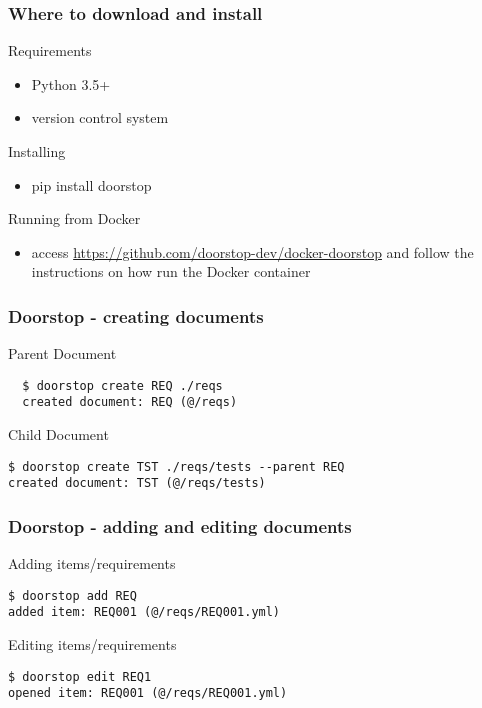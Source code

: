 \documentclass[aspectratio=169]{beamer}
\begin{document}
\begin{frame}
  \frametitle{Where to download and install}  
  \begin{block}{Requirements}
  \begin{itemize}
    \item Python 3.5+
    \item version control system  
  \end{itemize}
  \end{block}
  \begin{block}{Installing}
  \begin{itemize}
    \item pip install doorstop  
  \end{itemize}
  \end{block}
  \begin{block}{Running from Docker}
  \begin{itemize}
    \item access \url{https://github.com/doorstop-dev/docker-doorstop} and follow the instructions on how run the Docker container
  \end{itemize}
  \end{block}
\end{frame}

\begin{frame}[fragile]
  \frametitle{Doorstop - creating documents}
  \begin{block}{Parent Document}
  \begin{verbatim}
  $ doorstop create REQ ./reqs
  created document: REQ (@/reqs)
  \end{verbatim}  
  \end{block}
  \begin{block}{Child Document}
  \begin{verbatim}
$ doorstop create TST ./reqs/tests --parent REQ
created document: TST (@/reqs/tests)  \end{verbatim}  
  \end{block}
\end{frame}

\begin{frame}[fragile]
  \frametitle{Doorstop - adding and editing documents}
  \begin{block}{Adding items/requirements}
   \begin{verbatim}
$ doorstop add REQ
added item: REQ001 (@/reqs/REQ001.yml)  
   \end{verbatim} 
  \end{block}
  \begin{block}{Editing items/requirements}
  \begin{verbatim}
$ doorstop edit REQ1
opened item: REQ001 (@/reqs/REQ001.yml) 
  \end{verbatim}
  \end{block}
\end{frame}
\end{document}
